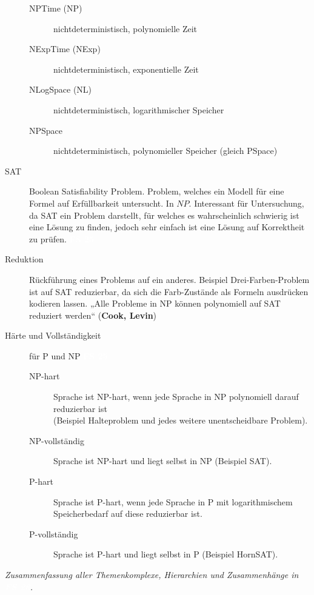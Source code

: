 \documentclass[a4paper,10pt]{article}
\newcommand{\vl}[1]{\colorbox{vl}{\textcolor{white}{\small\textbf{#1}}}}
\newcommand{\f}[1]{\textbf{#1}}
\begin{document}
\begin{description}
\begin{description}
                \item[NPTime (NP)] nichtdeterministisch, polynomielle Zeit
                \item[NExpTime (NExp)] nichtdeterministisch, exponentielle Zeit
                \item[NLogSpace (NL)] nichtdeterministisch, logarithmischer Speicher
                \item[NPSpace] nichtdeterministisch, polynomieller Speicher (gleich PSpace)
            \end{description}

        \item[SAT] Boolean Satisfiability Problem. Problem, welches ein Modell für eine Formel auf Erfüllbarkeit untersucht. In $NP$.
            Interessant für Untersuchung, da SAT ein Problem darstellt, für welches es wahrscheinlich schwierig ist eine Lösung zu finden,
            jedoch sehr einfach ist eine Lösung auf Korrektheit zu prüfen. \vl{FS 25}

        \item[Reduktion] Rückführung eines Problems auf ein anderes. Beispiel Drei-Farben-Problem ist auf SAT reduzierbar, da sich die Farb-Zustände als
            Formeln ausdrücken kodieren lassen. „Alle Probleme in NP können polynomiell auf SAT reduziert werden“ (\f{Cook, Levin})

        \item[Härte und Vollständigkeit] für P und NP \vl{FS 25}
            \begin{description}
                \item[NP-hart] Sprache ist NP-hart, wenn jede Sprache in NP polynomiell darauf reduzierbar ist \\
                    (Beispiel Halteproblem und jedes weitere unentscheidbare Problem).
                \item[NP-vollständig] Sprache ist NP-hart und liegt selbst in NP (Beispiel SAT).

                \item[P-hart] Sprache ist P-hart, wenn jede Sprache in P mit logarithmischem Speicherbedarf auf diese reduzierbar ist.
                \item[P-vollständig] Sprache ist P-hart und liegt selbst in P (Beispiel HornSAT).
            \end{description}
    \end{description}

    \textit{Zusammenfassung aller Themenkomplexe, Hierarchien und Zusammenhänge in \vl{FS 26}.}
\end{document}
